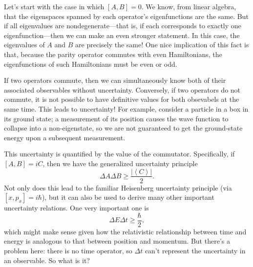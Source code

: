 \documentclass[../p052main.tex]{subfiles}
\begin{document}
Let's start with the case in which $[A,B] = 0$.
We know, from linear algebra, that the eigenspaces spanned by each operator's eigenfunctions are the same.
But if all eigenvalues are nondegenerate---that is, if each corresponds to exactly one eigenfunction---then we can make an even stronger statement.
In this case, the eigenvalues of $A$ and $B$ are precisely the same!
One nice implication of this fact is that, because the parity operator commutes with even Hamiltonians, the eigenfunctions of such Hamiltonians must be even or odd.

If two operators commute, then we can simultaneously know both of their associated observables without uncertainty.
Conversely, if two operators do not commute, it is not possible to have definitive values for both obsevabels at the same time.
This leads to uncertainty!
For example, consider a particle in a box in its ground state; a measurement of its position causes the wave function to collapse into a non-eigenstate, so we are not guaranteed to get the ground-state energy upon a subsequent measurement.

This uncertainty is quantified by the value of the commutator.
Specifically, if $[A, B] = iC$, then we have the generalized uncertainty principle
\[ \Delta A \Delta B \geq \frac{|\left< C \right>|}{2}. \]
Not only does this lead to the familiar Heisenberg uncertainty principle (via $[x, p_x] = i\hbar$), but it can also be used to derive many other important uncertainty relations.
One very important one is
\[ \Delta E \Delta t \geq \frac{\hbar}{2}, \]
which might make sense given how the relativistic relationship between time and energy is analogous to that between position and momentum.
But there's a problem here: there is no time operator, so $\Delta t$ can't represent the uncertainty in an observable.
So what is it?
\end{document}
